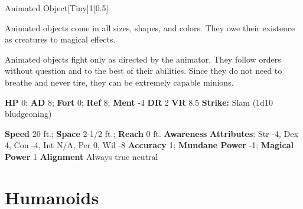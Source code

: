   
  \begin{monsection}{Animated Object}[Tiny]{1}[0.5]
    \vspace{-1em}\vspace{-1em}
    \vspace{0em}

    
    Animated objects come in all sizes, shapes, and colors. They owe their existence as creatures to magical effects.

    Animated objects fight only as directed by the animator. They follow orders without question and to the best of their abilities. Since they do not need to breathe and never tire, they can be extremely capable minions.
  
    

    \begin{spellcontent}
      \begin{spelltargetinginfo}
        \pari \textbf{HP} 0;
          \textbf{AD} 8;
          \textbf{Fort} 0;
          \textbf{Ref} 8;
          \textbf{Ment} -4
        \pari \textbf{DR} 2
        \pari \textbf{VR} 8.5
        \pari \textbf{Strike:}
            Slam  (1d10 bludgeoning)
      \end{spelltargetinginfo}
    \end{spellcontent}
    \begin{monsterfooter}
      \pari \textbf{Speed} 20 ft.;
        \textbf{Space} 2-1/2 ft.;
        \textbf{Reach} 0 ft.
      \pari \textbf{Awareness} 
      \pari \textbf{Attributes}:
        Str -4, Dex 4,
        Con -4, Int N/A,
        Per 0, Wil -8
      \pari \textbf{Accuracy} 1;
        \textbf{Mundane Power} -1;
      \textbf{Magical Power} 1
      \pari \textbf{Alignment} Always true neutral
    \end{monsterfooter}
  \end{monsection}
  
  
        \section{Humanoids}
      
